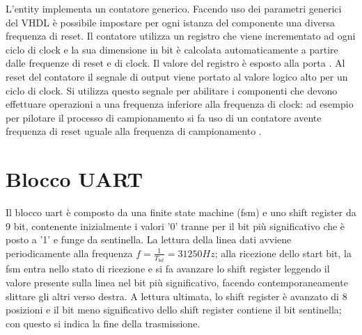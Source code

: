 \begin{center}
\end{center}
L'entity  implementa un contatore generico.
Facendo uso dei parametri generici del VHDL è possibile impostare per ogni istanza
del componente una diversa frequenza di reset.
Il contatore utilizza un registro che viene incrementato ad ogni ciclo di clock
e la sua dimensione in bit è calcolata automaticamente a partire dalle frequenze
di reset e di clock. Il valore del registro è esposto alla porta .
Al reset del contatore il segnale di output  viene portato al valore
logico alto per un ciclo di clock.
Si utilizza questo segnale per abilitare i componenti che devono
effettuare operazioni a una frequenza inferiore alla frequenza di clock:
ad esempio per pilotare il processo di campionamento si fa uso di un contatore
avente frequenza di reset uguale alla frequenza di campionamento .

\section{Blocco UART}
\label{sec:uart}


\begin{center}
\end{center}

Il blocco uart è composto da una finite state machine (fsm) e uno shift register da 9 bit, contenente inizialmente i valori '0' tranne per il bit più significativo che è posto a '1' e funge da sentinella. La lettura della linea dati avviene periodicamente alla frequenza $f = \frac{1}{T_{bit}} = 31250 \si{Hz}$; alla ricezione dello start bit, la fsm entra nello stato di ricezione e si fa avanzare lo shift register leggendo il valore presente sulla linea nel bit più significativo, facendo contemporaneamente slittare gli altri verso destra.
A lettura ultimata, lo shift register è avanzato di 8 posizioni e il bit meno significativo dello shift register contiene il bit sentinella; con questo si indica la fine della trasmissione.

